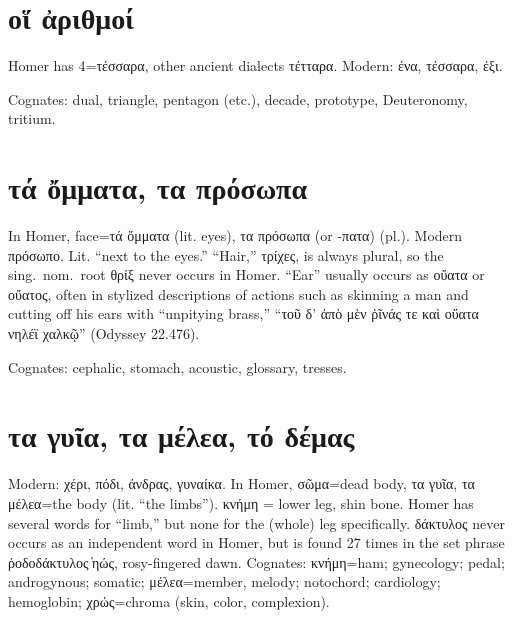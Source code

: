 \documentclass[12pt,openany]{book}
\newenvironment{notes}{\vfill\scriptsize\begin{flushright}}{\end{flushright}}
\newcommand{\fig}[1]{\begin{center}\end{center}}
\begin{document}

\chapter{οἵ ἀριθμοί}

\fig{numbers/numbers.svg}

\begin{notes}
Homer has 4=τέσσαρα, other ancient dialects τέτταρα.
Modern: ένα, τέσσαρα, έξι.

Cognates: dual, triangle, pentagon (etc.), decade,
prototype, Deuteronomy, tritium.
\end{notes}


\chapter{τά ὄμματα, τα πρόσωπα}

\fig{face/face.svg}

\begin{notes}
In Homer, face=τά ὄμματα (lit. eyes), τα πρόσωπα (or -πατα) (pl.).
Modern πρόσωπο. Lit. ``next to the eyes.''
``Hair,'' τρίχες, is always plural, so the sing.~nom.~root θρίξ never occurs in Homer.
``Ear'' usually occurs as οὔατα or οὔατος, often in stylized descriptions of actions such as
skinning a man and cutting off his ears with ``unpitying brass,'' ``τοῦ δ' ἀπὸ μὲν ῥῖνάς τε καὶ οὔατα νηλέϊ χαλκῷ'' (Odyssey 22.476).


Cognates: cephalic, stomach,
acoustic, glossary, tresses.
\end{notes}


\chapter{τα γυῖα, τα μέλεα, τό δέμας}

\fig{body/body.svg}

\begin{notes}
Modern: χέρι, πόδι, άνδρας, γυναίκα. In Homer, σῶμα=dead body, τα γυῖα, τα μέλεα=the body (lit. ``the limbs'').
κνήμη = lower leg, shin bone. Homer has several words for ``limb,'' but none for the (whole) leg specifically.
δάκτυλος never occurs as an independent word in Homer, but is found 27 times in the
set phrase ῥοδοδάκτυλος ̓ηώς, rosy-fingered dawn. Cognates: κνήμη=ham; gynecology; pedal; androgynous; somatic; μέλεα=member, melody;
notochord; cardiology; hemoglobin; χρώς=chroma (skin, color, complexion).
\end{notes}
\end{document}
